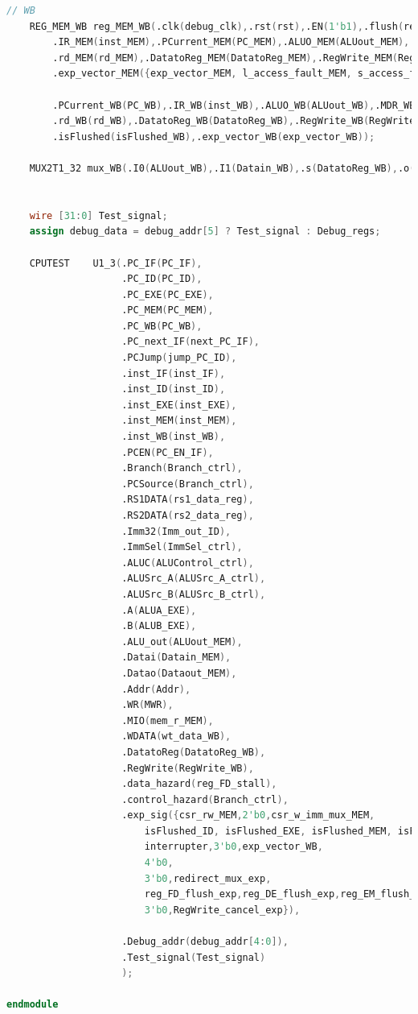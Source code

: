 \begin{lstlisting}[language = {verilog}]
    // WB
    REG_MEM_WB reg_MEM_WB(.clk(debug_clk),.rst(rst),.EN(1'b1),.flush(reg_MW_flush_exp | isFlushed_MEM),
        .IR_MEM(inst_MEM),.PCurrent_MEM(PC_MEM),.ALUO_MEM(ALUout_MEM),.Datai(Datain_MEM),
        .rd_MEM(rd_MEM),.DatatoReg_MEM(DatatoReg_MEM),.RegWrite_MEM(RegWrite_MEM),
        .exp_vector_MEM({exp_vector_MEM, l_access_fault_MEM, s_access_fault_MEM}),

        .PCurrent_WB(PC_WB),.IR_WB(inst_WB),.ALUO_WB(ALUout_WB),.MDR_WB(Datain_WB),
        .rd_WB(rd_WB),.DatatoReg_WB(DatatoReg_WB),.RegWrite_WB(RegWrite_WB),
        .isFlushed(isFlushed_WB),.exp_vector_WB(exp_vector_WB));
    
    MUX2T1_32 mux_WB(.I0(ALUout_WB),.I1(Datain_WB),.s(DatatoReg_WB),.o(wt_data_WB));


    wire [31:0] Test_signal;
    assign debug_data = debug_addr[5] ? Test_signal : Debug_regs;
    
    CPUTEST    U1_3(.PC_IF(PC_IF),
                    .PC_ID(PC_ID),
                    .PC_EXE(PC_EXE),
                    .PC_MEM(PC_MEM),
                    .PC_WB(PC_WB),
                    .PC_next_IF(next_PC_IF),
                    .PCJump(jump_PC_ID),
                    .inst_IF(inst_IF),
                    .inst_ID(inst_ID),
                    .inst_EXE(inst_EXE),
                    .inst_MEM(inst_MEM),
                    .inst_WB(inst_WB),
                    .PCEN(PC_EN_IF),
                    .Branch(Branch_ctrl),
                    .PCSource(Branch_ctrl),
                    .RS1DATA(rs1_data_reg),
                    .RS2DATA(rs2_data_reg),
                    .Imm32(Imm_out_ID),
                    .ImmSel(ImmSel_ctrl),
                    .ALUC(ALUControl_ctrl),
                    .ALUSrc_A(ALUSrc_A_ctrl),
                    .ALUSrc_B(ALUSrc_B_ctrl),
                    .A(ALUA_EXE),
                    .B(ALUB_EXE),
                    .ALU_out(ALUout_MEM),
                    .Datai(Datain_MEM),
                    .Datao(Dataout_MEM),
                    .Addr(Addr),
                    .WR(MWR),
                    .MIO(mem_r_MEM),
                    .WDATA(wt_data_WB),
                    .DatatoReg(DatatoReg_WB),
                    .RegWrite(RegWrite_WB),
                    .data_hazard(reg_FD_stall),
                    .control_hazard(Branch_ctrl),
                    .exp_sig({csr_rw_MEM,2'b0,csr_w_imm_mux_MEM,
                        isFlushed_ID, isFlushed_EXE, isFlushed_MEM, isFlushed_WB,
                        interrupter,3'b0,exp_vector_WB,
                        4'b0,
                        3'b0,redirect_mux_exp,
                        reg_FD_flush_exp,reg_DE_flush_exp,reg_EM_flush_exp,reg_MW_flush_exp,
                        3'b0,RegWrite_cancel_exp}),

                    .Debug_addr(debug_addr[4:0]),
                    .Test_signal(Test_signal)    
                    );

endmodule
\end{lstlisting}